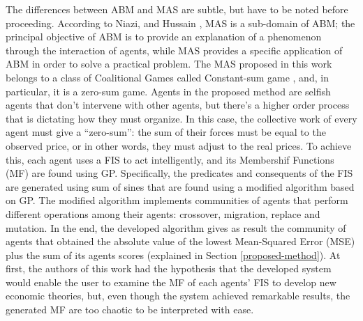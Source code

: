 \documentclass[12pt,journal,draftcls,onecolumn]{IEEEtran}
\begin{document}
The differences between ABM and MAS are subtle, but have to be noted before proceeding. According to Niazi, and Hussain \cite{Niazi_2011}, MAS is a sub-domain of ABM; the principal objective of ABM is to provide an explanation of a phenomenon through the interaction of agents, while MAS provides a specific application of ABM in order to solve a practical problem. The MAS proposed in this work belongs to a class of Coalitional Games called Constant-sum game \cite{Shoham2009}, and, in particular, it is a zero-sum game. Agents in the proposed method are selfish agents that don't intervene with other agents, but there's a higher order process that is dictating how they must organize. In this case, the collective work of every agent must give a ``zero-sum'': the sum of their forces must be equal to the observed price, or in other words, they must adjust to the real prices. To achieve this, each agent uses a FIS to act intelligently, and its Membershif Functions (MF) are found using GP. Specifically, the predicates and consequents of the FIS are generated using sum of sines that are found using a modified algorithm based on GP. The modified algorithm implements communities of agents that perform different operations among their agents: crossover, migration, replace and mutation. In the end, the developed algorithm gives as result the community of agents that obtained the absolute value of the lowest Mean-Squared Error (MSE) plus the sum of its agents scores (explained in Section \ref{proposed-method}). At first, the authors of this work had the hypothesis that the developed system would enable the user to examine the MF of each agents' FIS to develop new economic theories, but, even though the system achieved remarkable results, the generated MF are too chaotic to be interpreted with ease.
\end{document}
